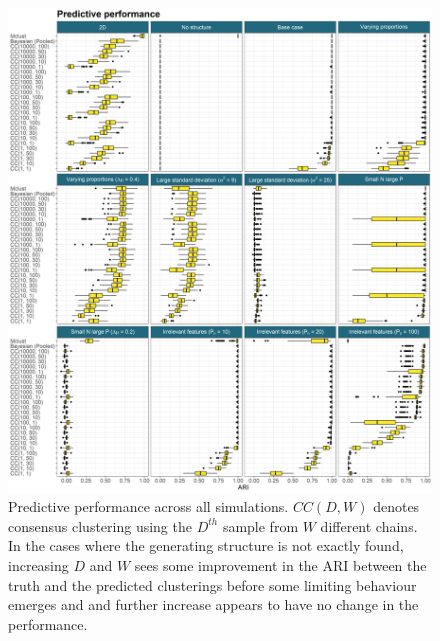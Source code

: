 \documentclass[]{article}
\begin{document}
\begin{figure} %
	\centering
	\includegraphics[scale=0.4]{./Images/Simulations/simulation_model_prediction.png}
	\caption{Predictive performance across all simulations. $CC(D, W)$ denotes consensus clustering using the $D^{th}$ sample from $W$ different chains. In the cases where the generating structure is not exactly found, increasing $D$ and $W$ sees some improvement in the ARI between the truth and the predicted clusterings before some limiting behaviour emerges and and further increase appears to have no change in the performance.}
	\label{fig:simPrediction}
\end{figure}

\end{document}
